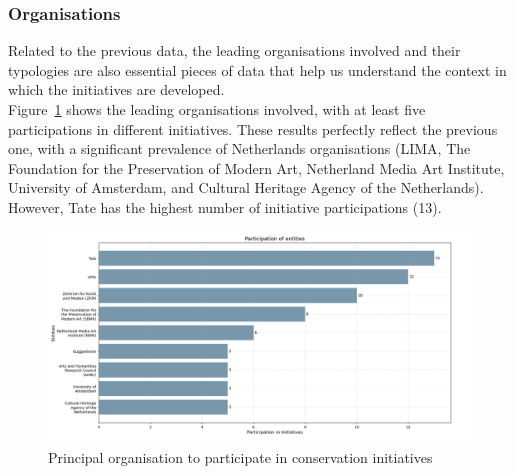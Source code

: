 \subsubsection{Organisations}
Related to the previous data, the leading organisations involved and their typologies are also essential pieces of data that help us understand the context in which the initiatives are developed.\\
Figure~\ref{fig:c1-org} shows the leading organisations involved, with at least five participations in different initiatives. These results perfectly reflect the previous one, with a significant prevalence of Netherlands organisations (LIMA, The Foundation for the Preservation of Modern Art, Netherland Media Art Institute, University of Amsterdam, and Cultural Heritage Agency of the Netherlands). However, Tate has the highest number of initiative participations (13).

\begin{figure}[!h]
    \centering
    \includegraphics[width=\textwidth]{chapters/1-state_of_the_art/image/plot01-organisation.png}
    \caption{Principal organisation to participate in conservation initiatives}
    \label{fig:c1-org}
\end{figure}

